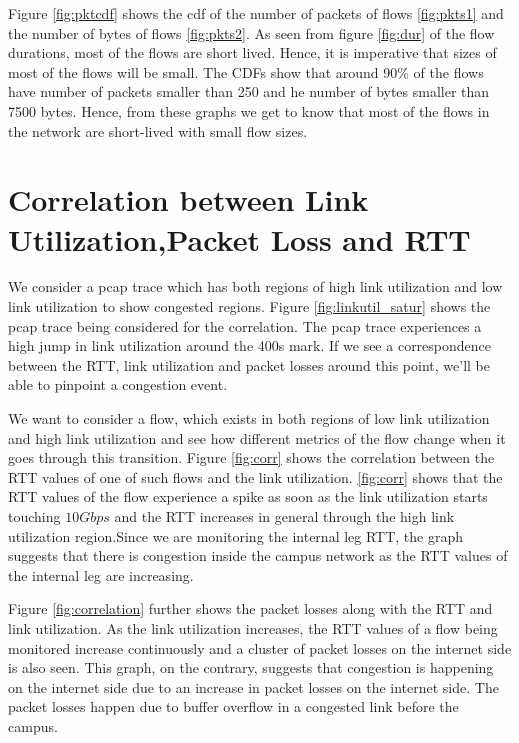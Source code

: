 Figure \ref{fig:pktcdf} shows the cdf of the number of packets of flows \ref{fig:pkts1} and the number of bytes of flows \ref{fig:pkts2}. As seen from figure \ref{fig:dur} of the flow durations, most of the flows are short lived. Hence, it is imperative that sizes of most of the flows will be small. The CDFs show that around 90\% of the flows have number of packets smaller than 250 and he number of bytes smaller than 7500 bytes. Hence, from these graphs we get to know that most of the flows in the network are short-lived with small flow sizes.




\section{Correlation between Link Utilization,Packet Loss and RTT}

We consider a pcap trace which has both regions of high link utilization and low link utilization to show congested regions. Figure \ref{fig:linkutil_satur} shows the pcap trace being considered for the correlation. The pcap trace experiences a high jump in link utilization around the 400s mark. If we see a correspondence between the RTT, link utilization and packet losses around this point, we'll be able to pinpoint a congestion event.

We want to consider a flow, which exists in both regions of low link utilization and high link utilization and see how different metrics of the flow change when it goes through this transition. Figure \ref{fig:corr} shows the correlation between the RTT values of one of such flows and the link utilization. \ref{fig:corr} shows that the RTT values of the flow experience a spike as soon as the link utilization starts touching $10Gbps$ and the RTT increases in general through the high link utilization region.Since we are monitoring the internal leg RTT, the graph suggests that there is congestion inside the campus network as the RTT values of the internal leg are increasing.

Figure \ref{fig:correlation} further shows the packet losses along with the RTT and link utilization. As the link utilization increases, the RTT values of a flow being monitored increase continuously and a cluster of packet losses on the internet side is also seen. This graph, on the contrary, suggests that congestion is happening on the internet side due to an increase in packet losses on the internet side. The packet losses happen due to buffer overflow in a congested link before the campus. 

